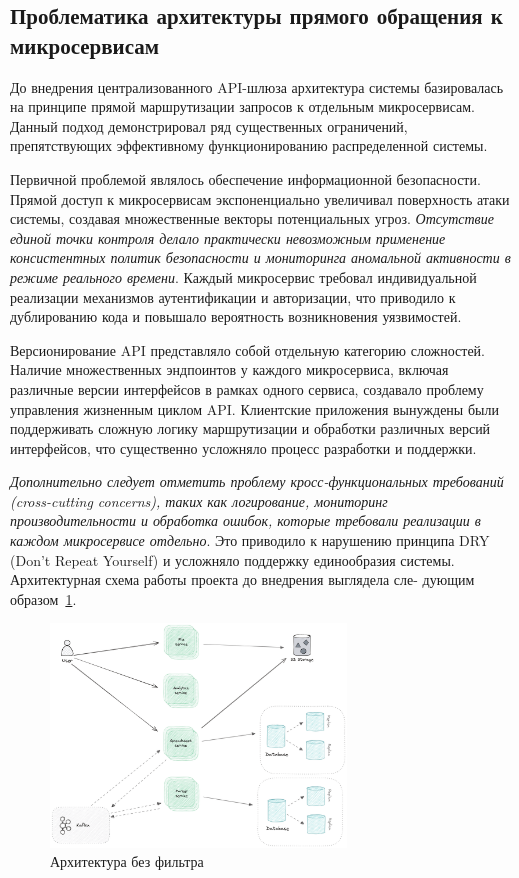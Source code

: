 \subsection{Проблематика архитектуры прямого обращения к микросервисам}

До внедрения централизованного API-шлюза архитектура системы базировалась на принципе прямой маршрутизации запросов к отдельным микросервисам. Данный подход демонстрировал ряд существенных ограничений, препятствующих эффективному функционированию распределенной системы.

Первичной проблемой являлось обеспечение информационной безопасности. Прямой доступ к микросервисам экспоненциально увеличивал поверхность атаки системы, создавая множественные векторы потенциальных угроз. \textit{Отсутствие единой точки контроля делало практически невозможным применение консистентных политик безопасности и мониторинга аномальной активности в режиме реального времени}. Каждый микросервис требовал индивидуальной реализации механизмов аутентификации и авторизации, что приводило к дублированию кода и повышало вероятность возникновения уязвимостей.

Версионирование API представляло собой отдельную категорию сложностей. Наличие множественных эндпоинтов у каждого микросервиса, включая различные версии интерфейсов в рамках одного сервиса, создавало проблему управления жизненным циклом API. Клиентские приложения вынуждены были поддерживать сложную логику маршрутизации и обработки различных версий интерфейсов, что существенно усложняло процесс разработки и поддержки.

\textit{Дополнительно следует отметить проблему кросс-функциональных требований (cross-cutting concerns), таких как логирование, мониторинг производительности и обработка ошибок, которые требовали реализации в каждом микросервисе отдельно}. Это приводило к нарушению принципа DRY (Don't Repeat Yourself) и усложняло поддержку единообразия системы.
Архитектурная схема работы проекта до внедрения выглядела сле-
дующим образом~\ref{fig:wo-gateway-project}.

\begin{figure}[htbp]
    \centering
    \includegraphics[width=0.7\textwidth]{Dissertation/images/wo-gateway-project}
    \caption{Архитектура без фильтра}
    \label{fig:wo-gateway-project}
\end{figure}

